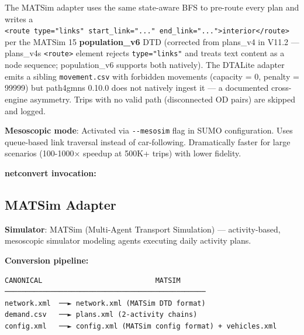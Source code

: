 The MATSim adapter uses the same state-aware BFS to pre-route every plan
and writes a
\texttt{\textless{}route\ type="links"\ start\_link="..."\ end\_link="..."\textgreater{}interior\textless{}/route\textgreater{}}
per the MATSim 15 \textbf{population\_v6} DTD (corrected from plans\_v4
in V11.2 --- plans\_v4\textquotesingle s
\texttt{\textless{}route\textgreater{}} element rejects
\texttt{type="links"} and treats text content as a node sequence;
population\_v6 supports both natively). The DTALite adapter emits a
sibling \texttt{movement.csv} with forbidden movements (capacity = 0,
penalty = 99999) but path4gmns 0.10.0 does not natively ingest it --- a
documented cross-engine asymmetry. Trips with no valid path
(disconnected OD pairs) are skipped and logged.

\textbf{Mesoscopic mode}: Activated via \texttt{-\/-mesosim} flag in
SUMO configuration. Uses queue-based link traversal instead of
car-following. Dramatically faster for large scenarios (100-1000×
speedup at 500K+ trips) with lower fidelity.

\textbf{netconvert invocation:}

\begin{Shaded}
\begin{Highlighting}[]
 \DataTypeTok{\textbackslash{}}
           \DataTypeTok{\textbackslash{}}
           \DataTypeTok{\textbackslash{}}
\end{Highlighting}
\end{Shaded}

\subsection{MATSim Adapter}\label{343-matsim-adapter}

\textbf{Simulator}: MATSim (Multi-Agent Transport Simulation) ---
activity-based, mesoscopic simulator modeling agents executing daily
activity plans.

\textbf{Conversion pipeline:}

\begin{verbatim}
CANONICAL                           MATSIM
────────────────────────────────────────────────
network.xml  ──► network.xml (MATSim DTD format)
demand.csv   ──► plans.xml (2-activity chains)
config.xml   ──► config.xml (MATSim config format) + vehicles.xml
\end{verbatim}

